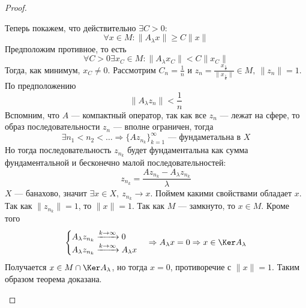 \begin{proof}
\begin{enumerate}
		Теперь покажем, что действительно $\exists C>0$:
		$$
		\forall x \in M\colon \|A_\lambda x\| \geq C\|x\| 
		$$
		Предположим противное, то есть 
		$$
		\forall C > 0 \exists x_C \in M\colon \|A_\lambda x_C\| < C\|x_C\|
		$$
		Тогда, как минимум, $x_C \neq 0$. Рассмотрим $C_n = \displaystyle\frac{1}{n}$ и $z_n = \displaystyle\frac{x_{\frac{1}{n}}}{\|x_{\frac{1}{n}}\|} \in M, \ \|z_n\| = 1$. По предположению 
		$$
		\|A_\lambda z_n \| < \frac{1}{n} 
		$$
		Вспомним, что $A$ --- компактный оператор, так как все $z_n$ --- лежат на сфере, то образ последовательности $z_n$ --- вполне ограничен, тогда 
		$$
		\exists n_1 < n_2 < \dots \Rightarrow \{A z_{n_k} \}_{k=1}^\infty\text{ --- фундаметальна в $X$}
		$$
		Но тогда последовательность $z_{n_k}$ будет фундаментальна как сумма фундаментальной и бесконечно малой последовательностей:
		$$
		z_{n_k} = \frac{A z_{n_k} - A_\lambda z_{n_k}}{\lambda}
		$$
		$X$ --- банахово, значит $\exists x \in X, \ z_{n_k} \to x$. Поймем какими свойствами обладает $x$. Так как $\|z_{n_k}\| = 1$, то $\|x\| = 1$. Так как $M$ --- замкнуто, то $x \in M$. Кроме того 
		$$
		\begin{cases}
			A_\lambda z_{n_k} \xrightarrow{k \to \infty} 0 \\
			A_\lambda z_{n_k} \xrightarrow{k \to \infty} A_\lambda x
		\end{cases} \Rightarrow A_\lambda x = 0 \Rightarrow x \in \Ker A_\lambda
		$$
		Получается $x \in M \cap \Ker A_\lambda$, но тогда $x = 0$, противоречие с $\|x\| = 1$. Таким образом теорема доказана. 
	\end{enumerate}
\end{proof}
